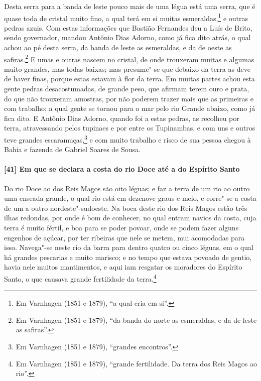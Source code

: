 Desta serra para a banda de leste pouco mais de uma légua está uma serra, que é quase toda
de cristal muito fino, a qual terá em si muitas esmeraldas,\footnote{ Em Varnhagen (1851 e
1879), ``a qual cria em si''.} e outras pedras azuis. Com estas informações que Bastião
Fernandes deu a Luís de Brito, sendo governador, mandou Antônio Dias Adorno, como já fica
dito atrás, o qual achou ao pé desta serra, da banda de leste as esmeraldas, e da de oeste
as safiras.\footnote{ Em Varnhagen (1851 e 1879), ``da banda do norte as esmeraldas, e da
de leste as safiras''.} E umas e outras nascem no cristal, de onde trouxeram muitas e
algumas muito grandes, mas todas baixas; mas presume"-se que debaixo da terra as deve de
haver finas, porque estas estavam à flor da terra. Em muitas partes achou esta gente
pedras desacostumadas, de grande peso, que afirmam terem ouro e prata, do que não
trouxeram amostras, por não poderem trazer mais que as primeiras e com trabalho; a qual
gente se tornou para o mar pelo rio Grande abaixo, como já fica dito. E Antônio Dias
Adorno, quando foi a estas pedras, as recolheu por terra, atravessando pelos tupinaes e
por entre os Tupinambas, e com uns e outros teve grandes escaramuças,\footnote{ Em
Varnhagen (1851 e 1879), ``grandes encontros''.} e com muito trabalho e risco de sua
pessoa chegou à Bahia e fazenda de Gabriel Soares de Sousa.

\paragraph{[41] Em que se declara a costa do rio Doce até a do Espírito Santo} \quad
Do rio Doce ao dos Reis Magos são oito léguas; e faz a terra de um rio ao outro uma
enseada grande, o qual rio está em dezenove graus e meio, e corre"-se a costa de um a outro
nordeste"-sudoeste. Na boca deste rio dos Reis Magos estão três ilhas redondas, por onde é
bom de conhecer, no qual entram navios da costa, cuja terra é muito fértil, e boa para se
poder povoar, onde se podem fazer alguns engenhos de açúcar, por ter ribeiras que nele se
metem, mui acomodadas para isso. Navega"-se neste rio da barra para dentro quatro ou cinco
léguas, em o qual há grandes pescarias e muito marisco; e no tempo que estava povoado de
gentio, havia nele muitos mantimentos, e aqui iam resgatar os moradores do Espírito Santo,
o que causava grande fertilidade da terra.\footnote{ Em Varnhagen (1851 e 1879), ``grande
fertilidade. Da terra dos Reis Magos ao rio''.}

